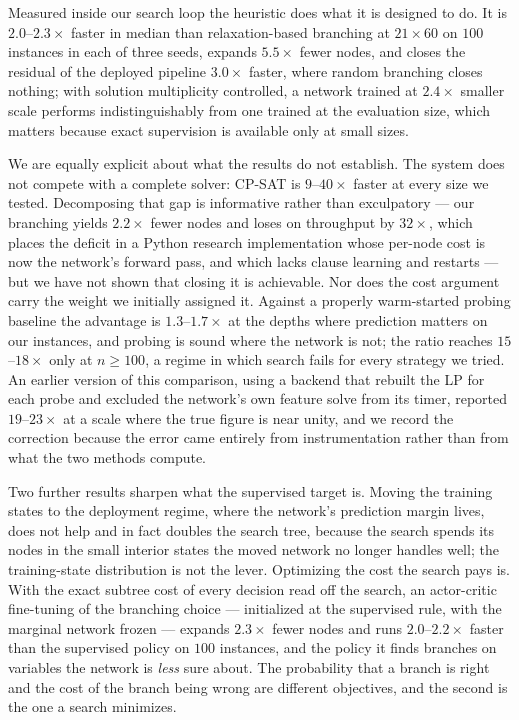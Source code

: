 \documentclass[preprint,12pt]{elsarticle}
\begin{document}
Measured inside our search loop the heuristic does what it is designed to do. It is $2.0$--$2.3\times$ faster in median than relaxation-based branching at $21\times60$ on $100$ instances in each of three seeds, expands $5.5\times$ fewer nodes, and closes the residual of the deployed pipeline $3.0\times$ faster, where random branching closes nothing; with solution multiplicity controlled, a network trained at $2.4\times$ smaller scale performs indistinguishably from one trained at the evaluation size, which matters because exact supervision is available only at small sizes.

We are equally explicit about what the results do not establish. The system does not compete with a complete solver: CP-SAT is $9$--$40\times$ faster at every size we tested. Decomposing that gap is informative rather than exculpatory --- our branching yields $2.2\times$ fewer nodes and loses on throughput by $32\times$, which places the deficit in a Python research implementation whose per-node cost is now the network's forward pass, and which lacks clause learning and restarts --- but we have not shown that closing it is achievable. Nor does the cost argument carry the weight we initially assigned it. Against a properly warm-started probing baseline the advantage is $1.3$--$1.7\times$ at the depths where prediction matters on our instances, and probing is sound where the network is not; the ratio reaches $15$--$18\times$ only at $n\ge100$, a regime in which search fails for every strategy we tried. An earlier version of this comparison, using a backend that rebuilt the LP for each probe and excluded the network's own feature solve from its timer, reported $19$--$23\times$ at a scale where the true figure is near unity, and we record the correction because the error came entirely from instrumentation rather than from what the two methods compute.

Two further results sharpen what the supervised target is. Moving the training states to the deployment regime, where the network's prediction margin lives, does not help and in fact doubles the search tree, because the search spends its nodes in the small interior states the moved network no longer handles well; the training-state distribution is not the lever. Optimizing the cost the search pays is. With the exact subtree cost of every decision read off the search, an actor-critic fine-tuning of the branching choice --- initialized at the supervised rule, with the marginal network frozen --- expands $2.3\times$ fewer nodes and runs $2.0$--$2.2\times$ faster than the supervised policy on $100$ instances, and the policy it finds branches on variables the network is \emph{less} sure about. The probability that a branch is right and the cost of the branch being wrong are different objectives, and the second is the one a search minimizes.
\end{document}
